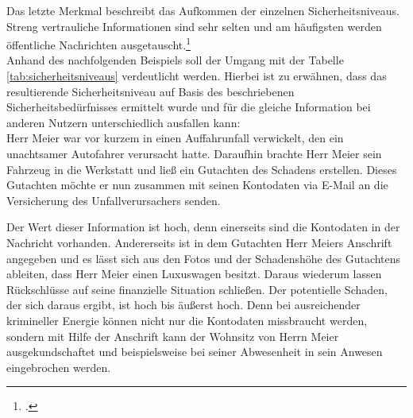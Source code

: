\documentclass  [paper=a4,
				fontsize=12pt,
				listof=totoc,
				bibliography=totoc
				]{scrreprt}
\begin{document}
		
		Das letzte Merkmal beschreibt das Aufkommen der einzelnen Sicherheitsniveaus. Streng vertrauliche Informationen sind sehr selten und am häufigsten werden öffentliche Nachrichten ausgetauscht.\footcite[Vgl.][]{TSE}
		\medskip\\
	
		Anhand des nachfolgenden Beispiels soll der Umgang mit der Tabelle \ref{tab:sicherheitsniveaus} verdeutlicht werden. Hierbei ist zu erwähnen, dass das resultierende Sicherheitsniveau auf Basis des beschriebenen Sicherheitsbedürfnisses ermittelt wurde und für die gleiche Information bei anderen Nutzern unterschiedlich ausfallen kann:
		\medskip\\
		
		Herr Meier war vor kurzem in einen Auffahrunfall verwickelt, den ein unachtsamer Autofahrer verursacht hatte. Daraufhin brachte Herr Meier sein Fahrzeug in die Werkstatt und ließ ein Gutachten des Schadens erstellen. Dieses Gutachten möchte er nun zusammen mit seinen Kontodaten via E-Mail an die Versicherung des Unfallverursachers senden. 
		
		Der Wert dieser Information ist hoch, denn einerseits sind die Kontodaten in der Nachricht vorhanden. Andererseits ist in dem Gutachten Herr Meiers Anschrift angegeben und es lässt sich aus den Fotos und der Schadenshöhe des Gutachtens ableiten, dass Herr Meier einen Luxuswagen besitzt. Daraus wiederum lassen Rückschlüsse auf seine finanzielle Situation schließen. Der potentielle Schaden, der sich daraus ergibt, ist hoch bis äußerst hoch. Denn bei ausreichender krimineller Energie können nicht nur die Kontodaten missbraucht werden, sondern mit Hilfe der Anschrift kann der Wohnsitz von Herrn Meier ausgekundschaftet und beispielsweise bei seiner Abwesenheit in sein Anwesen eingebrochen werden. 
		
\end{document}

